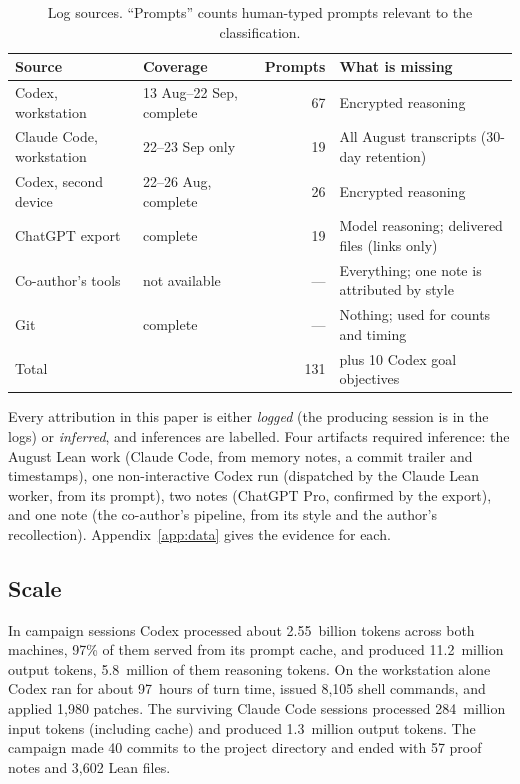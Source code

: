 \documentclass[11pt,a4paper]{article}
\begin{document}
\begin{table}[t]
\centering\small
\caption{Log sources. ``Prompts'' counts human-typed prompts relevant to the classification.}
\label{tab:sources}
\begin{tabularx}{\linewidth}{@{}lP{3.2cm}rY@{}}
\toprule
Source & Coverage & Prompts & What is missing\\ \midrule
Codex, workstation & 13 Aug--22 Sep, complete & 67 & Encrypted reasoning\\
Claude Code, workstation & 22--23 Sep only & 19 & All August transcripts (30-day retention)\\
Codex, second device & 22--26 Aug, complete & 26 & Encrypted reasoning\\
ChatGPT export & complete & 19 & Model reasoning; delivered files (links only)\\
Co-author's tools & not available & --- & Everything; one note is attributed by style\\
Git & complete & --- & Nothing; used for counts and timing\\ \midrule
Total & & 131 & plus 10 Codex goal objectives\\
\bottomrule
\end{tabularx}
\end{table}

Every attribution in this paper is either \emph{logged} (the producing session is in the logs) or
\emph{inferred}, and inferences are labelled. Four artifacts required inference: the August Lean work (Claude
Code, from memory notes, a commit trailer and timestamps), one non-interactive Codex run (dispatched by the
Claude Lean worker, from its prompt), two notes (ChatGPT Pro, confirmed by the export), and one note (the
co-author's pipeline, from its style and the author's recollection). Appendix~\ref{app:data} gives the
evidence for each.

\subsection{Scale}

In campaign sessions Codex processed about 2.55~billion tokens across both machines, 97\% of them served from
its prompt cache, and produced 11.2~million output tokens, 5.8~million of them reasoning tokens. On the workstation alone Codex
ran for about 97~hours of turn time, issued 8,105 shell commands, and applied 1,980 patches. The surviving
Claude Code sessions processed 284~million input tokens (including cache) and produced 1.3~million output
tokens. The campaign made 40 commits to the project directory and ended with 57 proof notes and 3,602 Lean
files.
\end{document}
